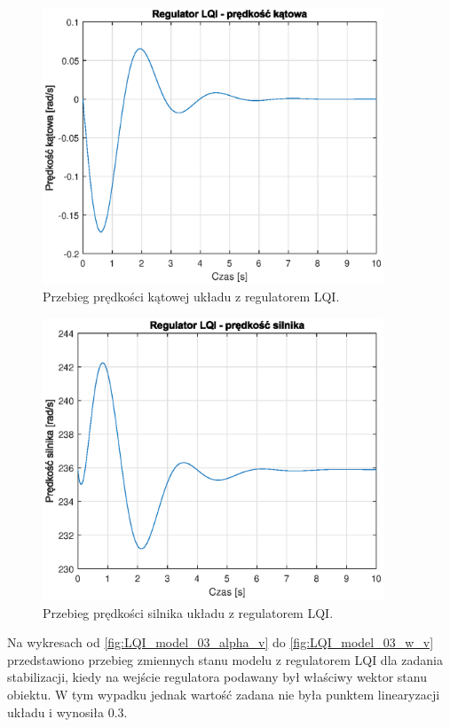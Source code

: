 \documentclass[11pt,a4paper]{article}
\begin{document}
\begin{figure}[H]
	\centering
	\includegraphics[width=4in]{Figures/LQI_model_dalpha_v.eps}
	\caption{Przebieg prędkości kątowej układu z regulatorem LQI.}
	\label{fig:LQI_model_dalpha_v}
\end{figure}

\begin{figure}[H]
	\centering
	\includegraphics[width=4in]{Figures/LQI_model_w_v.eps}
	\caption{Przebieg prędkości silnika układu z regulatorem LQI.}
	\label{fig:LQI_model_w_v}
\end{figure}

Na wykresach od \ref{fig:LQI_model_03_alpha_v} do \ref{fig:LQI_model_03_w_v} przedstawiono przebieg zmiennych stanu modelu z regulatorem LQI dla zadania stabilizacji, kiedy na wejście regulatora podawany był właściwy wektor stanu obiektu. W tym wypadku jednak wartość zadana nie była punktem linearyzacji układu i wynosiła 0.3.
\end{document}
